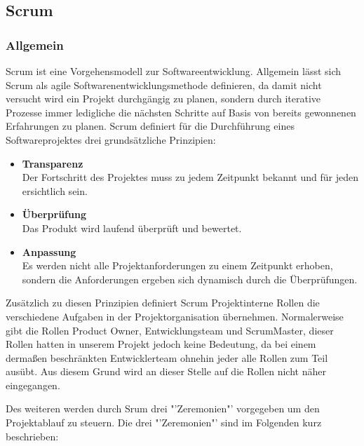 \subsection{Scrum}
\subsubsection{Allgemein}
Scrum ist eine Vorgehensmodell zur Softwareentwicklung. Allgemein lässt sich Scrum als agile Softwarenentwicklungsmethode definieren, da damit nicht versucht wird ein Projekt durchgängig zu planen, sondern durch iterative Prozesse immer ledigliche die nächsten Schritte auf Basis von bereits gewonnenen Erfahrungen zu planen.
Scrum definiert für die Durchführung eines Softwareprojektes drei grundsätzliche Prinzipien:

\begin{itemize}
\item \textbf{Transparenz}\\
Der Fortschritt des Projektes muss zu jedem Zeitpunkt bekannt und für jeden ersichtlich sein.
\item \textbf{Überprüfung}\\
Das Produkt wird laufend überprüft und bewertet.
\item \textbf{Anpassung}\\
Es werden nicht alle Projektanforderungen zu einem Zeitpunkt erhoben, sondern die Anforderungen ergeben sich dynamisch durch die Überprüfungen.
\end{itemize}

Zusätzlich zu diesen Prinzipien definiert Scrum Projektinterne Rollen die verschiedene Aufgaben in der Projektorganisation übernehmen. Normalerweise gibt die Rollen Product Owner, Entwicklungsteam und ScrumMaster, dieser Rollen hatten in unserem Projekt jedoch keine Bedeutung, da bei einem dermaßen beschränkten Entwicklerteam ohnehin jeder alle Rollen zum Teil ausübt. Aus diesem Grund wird an dieser Stelle auf die Rollen nicht näher eingegangen.

Des weiteren werden durch Srum drei "'Zeremonien"' vorgegeben um den Projektablauf zu steuern. Die drei "'Zeremonien"' sind im Folgenden kurz beschrieben:

